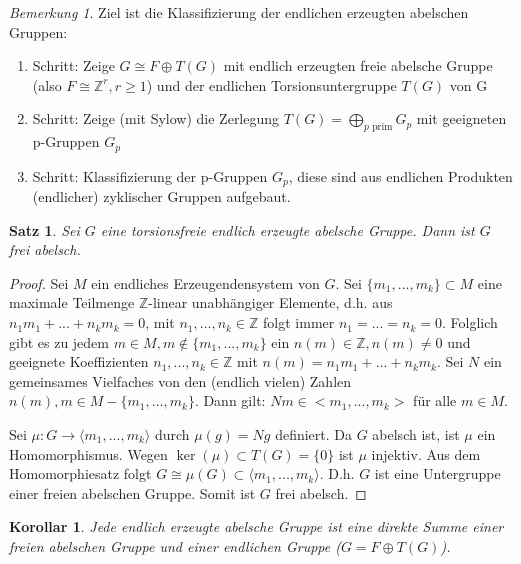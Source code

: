 \documentclass[12pt]{scrartcl} %
\newtheorem{thm}{Satz}
\newtheorem{kor}{Korollar}
\theoremstyle{definition}
\theoremstyle{remark}
\newtheorem*{nb}{Bemerkung}
\begin{document}

\begin{nb}
Ziel ist die Klassifizierung der endlichen erzeugten abelschen Gruppen:
\begin{enumerate}
\item Schritt: Zeige $G \cong F \oplus T(G)$ mit endlich erzeugten freie abelsche Gruppe (also $F \cong \mathbb{Z}^{r}, r \geq 1$) und der endlichen Torsionsuntergruppe $T(G)$ von G
\item Schritt: Zeige (mit Sylow) die Zerlegung $T(G) = \bigoplus_{p\text{ prim}} G_{p}$ mit geeigneten p-Gruppen $G_{p}$
\item Schritt: Klassifizierung der p-Gruppen $G_{p}$, diese sind aus endlichen Produkten (endlicher) zyklischer Gruppen aufgebaut.
\end{enumerate}
\end{nb}

\begin{thm}
Sei $G$ eine torsionsfreie endlich erzeugte abelsche Gruppe. Dann ist $G$ frei abelsch.
\end{thm}

\begin{proof}
Sei $M$ ein endliches Erzeugendensystem von $G$. 
Sei $\{m_{1},...,m_{k}\} \subset M$ eine maximale Teilmenge $\mathbb{Z}$-linear unabhängiger Elemente, d.h. aus $n_{1}m_{1}+...+n_{k}m_{k}=0$, mit $n_{1},...,n_{k} \in \mathbb{Z}$ folgt immer $n_{1}=...=n_{k}=0$. 
Folglich gibt es zu jedem $m \in M, m \notin \{m_{1},...,m_{k}\}$ ein $n(m) \in \mathbb{Z}, n(m)\neq 0$ und geeignete Koeffizienten $n_{1},...,n_{k} \in \mathbb{Z}$ mit $n(m)=n_{1}m_{1}+...+n_{k}m_{k}$. 
Sei $N$ ein gemeinsames Vielfaches von den (endlich vielen) Zahlen $n(m),m \in M-\{m_{1},...,m_{k}\}$. 
Dann gilt: $Nm \in <m_{1},...,m_{k}>$ für alle $m \in M$.

Sei $\mu :G\rightarrow \langle m_{1},...,m_{k} \rangle $ durch $\mu (g)=Ng$ definiert. Da $G$ abelsch ist, ist $\mu$ ein Homomorphismus. Wegen $\ker(\mu ) \subset T(G) = \{ 0\}$ ist $\mu$ injektiv. Aus dem Homomorphiesatz folgt $G \cong \mu (G) \subset \langle m_{1},...,m_{k}\rangle$. D.h. $G$ ist eine Untergruppe einer freien abelschen Gruppe. Somit ist $G$ frei abelsch.
\end{proof}

\begin{kor}
Jede endlich erzeugte abelsche Gruppe ist eine direkte Summe einer freien abelschen Gruppe und einer endlichen Gruppe ($G=F\oplus T(G)$).
\end{kor}
\end{document}
